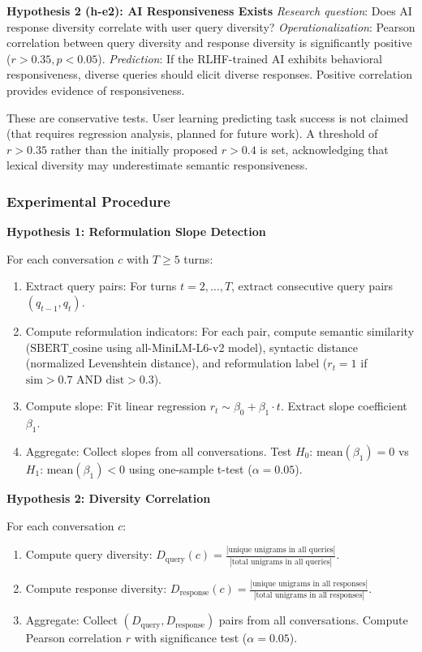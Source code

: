 \textbf{Hypothesis 2 (h-e2): AI Responsiveness Exists}  
\textit{Research question}: Does AI response diversity correlate with user query diversity?  
\textit{Operationalization}: Pearson correlation between query diversity and response diversity is significantly positive ($r > 0.35, p < 0.05$).  
\textit{Prediction}: If the RLHF-trained AI exhibits behavioral responsiveness, diverse queries should elicit diverse responses. Positive correlation provides evidence of responsiveness.

These are conservative tests. User learning predicting task success is not claimed (that requires regression analysis, planned for future work). A threshold of $r > 0.35$ rather than the initially proposed $r > 0.4$ is set, acknowledging that lexical diversity may underestimate semantic responsiveness.

\subsubsection{Experimental Procedure}

\textbf{Hypothesis 1: Reformulation Slope Detection}

For each conversation $c$ with $T \geq 5$ turns:
\begin{enumerate}
\item Extract query pairs: For turns $t = 2, \ldots, T$, extract consecutive query pairs $(q_{t-1}, q_t)$.
\item Compute reformulation indicators: For each pair, compute semantic similarity ($\text{SBERT}\_\text{cosine}$ using all-MiniLM-L6-v2 model), syntactic distance (normalized Levenshtein distance), and reformulation label ($r_t = 1$ if $\text{sim} > 0.7$ AND $\text{dist} > 0.3$).
\item Compute slope: Fit linear regression $r_t \sim \beta_0 + \beta_1 \cdot t$. Extract slope coefficient $\beta_1$.
\item Aggregate: Collect slopes from all conversations. Test $H_0$: $\text{mean}(\beta_1) = 0$ vs $H_1$: $\text{mean}(\beta_1) < 0$ using one-sample t-test ($\alpha = 0.05$).
\end{enumerate}

\textbf{Hypothesis 2: Diversity Correlation}

For each conversation $c$:
\begin{enumerate}
\item Compute query diversity: $D_{\text{query}}(c) = \frac{|\text{unique unigrams in all queries}|}{|\text{total unigrams in all queries}|}$.
\item Compute response diversity: $D_{\text{response}}(c) = \frac{|\text{unique unigrams in all responses}|}{|\text{total unigrams in all responses}|}$.
\item Aggregate: Collect $(D_{\text{query}}, D_{\text{response}})$ pairs from all conversations. Compute Pearson correlation $r$ with significance test ($\alpha = 0.05$).
\end{enumerate}

